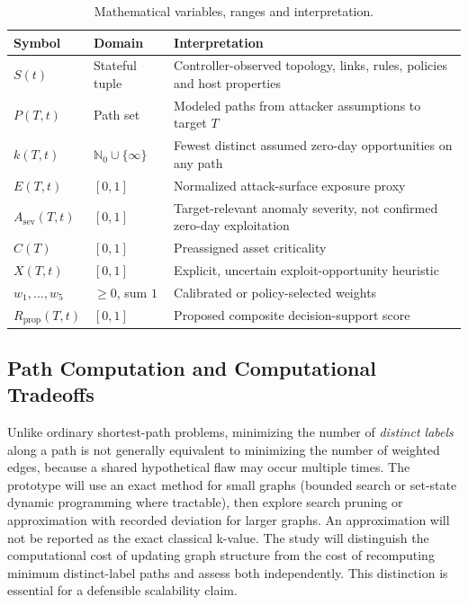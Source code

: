 \documentclass[12pt,a4paper,oneside]{article}
\begin{document}
\begin{table}[htbp]
\centering\small
\caption{Mathematical variables, ranges and interpretation.}\label{tab:variables}
\begin{tabularx}{\textwidth}{@{}p{31mm}p{28mm}X@{}}
\toprule
\textbf{Symbol} & \textbf{Domain} & \textbf{Interpretation}\\\midrule
$S(t)$ & Stateful tuple & Controller-observed topology, links, rules, policies and host properties\\
$P(T,t)$ & Path set & Modeled paths from attacker assumptions to target $T$\\
$k(T,t)$ & $\mathbb{N}_0\cup\{\infty\}$ & Fewest distinct assumed zero-day opportunities on any path\\
$E(T,t)$ & $[0,1]$ & Normalized attack-surface exposure proxy\\
$A_{\mathrm{sev}}(T,t)$ & $[0,1]$ & Target-relevant anomaly severity, not confirmed zero-day exploitation\\
$C(T)$ & $[0,1]$ & Preassigned asset criticality\\
$X(T,t)$ & $[0,1]$ & Explicit, uncertain exploit-opportunity heuristic\\
$w_1,\ldots,w_5$ & $\ge0$, sum $1$ & Calibrated or policy-selected weights\\
$R_{\mathrm{prop}}(T,t)$ & $[0,1]$ & Proposed composite decision-support score\\
\bottomrule
\end{tabularx}
\end{table}

\subsection{Path Computation and Computational Tradeoffs}
Unlike ordinary shortest-path problems, minimizing the number of \emph{distinct labels} along a path is not generally equivalent to minimizing the number of weighted edges, because a shared hypothetical flaw may occur multiple times. The prototype will use an exact method for small graphs (bounded search or set-state dynamic programming where tractable), then explore search pruning or approximation with recorded deviation for larger graphs. An approximation will not be reported as the exact classical k-value. The study will distinguish the computational cost of updating graph structure from the cost of recomputing minimum distinct-label paths and assess both independently. This distinction is essential for a defensible scalability claim.
\end{document}
